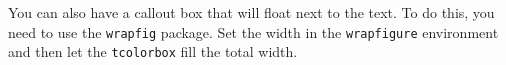 \documentclass[article,stormlight,timeline,statblock]{plotweaver}
\begin{document}
You can also have a callout box that will float next to the text. To do this, you need to use the \texttt{wrapfig} package. Set the width in the \texttt{wrapfigure} environment and then let the \texttt{tcolorbox} fill the total width.

\begin{figure}
    \begin{tcolorbox}[altcalloutBox, title={Alt Callout Box}, nobeforeafter]
        \lipsum[1][1-4]
    \end{tcolorbox}
\end{figure}

\lipsum[1]

\vspace{0.5\baselineskip}
\begin{tcolorbox}[paperBox, title={Torn Paper Box}]
    \lipsum[1]
\end{tcolorbox}

\vspace{\baselineskip}

\begin{tcolorbox}[paperBox, title={The Borders of Subsequent Boxes Match}]
    \lipsum[2]
\end{tcolorbox}


\clearpage
\end{document}
